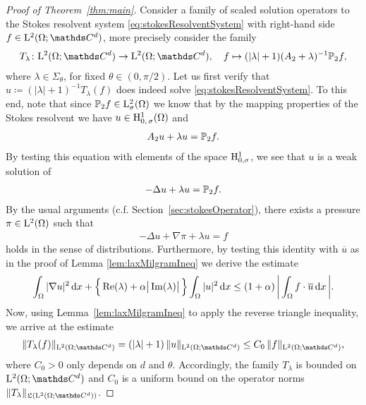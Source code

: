 \begin{proof}[Proof of Theorem~\ref{thm:main}]
  Consider a family of scaled solution operators to the Stokes resolvent system \eqref{eq:stokesResolventSystem} with right-hand side $f \in \Ell^2(\Omega; \C^d)$, more precisely consider the family
  \begin{align*}
    T_\lambda \colon \Ell^2(\Omega; \C^d) \to \Ell^2(\Omega; \C^d), \quad f \mapsto (|\lambda| + 1) (A_2 + \lambda)^{-1} \PP_2 f,
  \end{align*}
  where $\lambda \in \Sigma_\theta$, for fixed $\theta \in (0, \pi/2)$.
  Let us first verify that $u \coloneqq (|\lambda| + 1)^{-1} T_\lambda(f)$ does indeed solve \eqref{eq:stokesResolventSystem}.
  To this end, note that since $\mathbb{P}_2 f \in \mathrm{L}^2_\sigma(\Omega)$ we know that by the mapping properties of the Stokes resolvent we have $u \in \mathrm{H}^1_{0,\,\sigma}(\Omega)$ and
  \begin{align*}
    A_2 u + \lambda u = \mathbb{P}_2 f.
  \end{align*}
  By testing this equation with elements of the space $\mathrm{H}_{0, \sigma}^1$, we see that $u$ is a weak solution of 
  \begin{align*}
    -\Delta u + \lambda u = \mathbb{P}_2 f.
  \end{align*}
  By the usual arguments (c.f. Section~\ref{sec:stokesOperator}), there exists a pressure $\pi \in \mathrm{L}^2(\Omega)$ such that 
  \begin{align*}
    -\Delta u + \nabla \pi + \lambda u = f
  \end{align*}
  holds in the sense of distributions.
  Furthermore, by testing this identity with $\overline u$ as in the proof of Lemma \ref{lem:laxMilgramIneq} we derive the estimate
  \begin{align}
    \label{eq:inequalityUnderConsideration}
    \int_\Omega |\nabla u|^2 \, {\operatorname{d}\!{x}} + \Big\{ \operatorname{Re}(\lambda) + \alpha \big| \operatorname{Im}(\lambda) \big| \, \Big\} \int_\Omega |u|^2 \, {\operatorname{d}\!{x}} 
    \leq (1 + \alpha)\, \bigg| \int_\Omega f \cdot \overline u \, {\operatorname{d}\!{x}}\, \bigg|.
  \end{align} 
  Now, using Lemma~\ref{lem:laxMilgramIneq} to apply the reverse triangle inequality, we arrive at the estimate
  \begin{align*}
    \| T_\lambda(f) \|_{\Ell^2(\Omega; \C^d)} = (|\lambda| + 1)\, \|u\|_{\Ell^2(\Omega; \C^d)}
    \leq C_0 \, \|f\|_{\Ell^2(\Omega; \C^d)},
  \end{align*}
  where $C_0 > 0$ only depends on $d$ and $\theta$.
  Accordingly, the family $T_\lambda$ is bounded on $\Ell^2(\Omega; \C^d)$ and $C_0$ is a uniform bound on the operator norms $\|T_\lambda\|_{\Li(\Ell^2(\Omega; \C^d))}$.


\end{proof}
